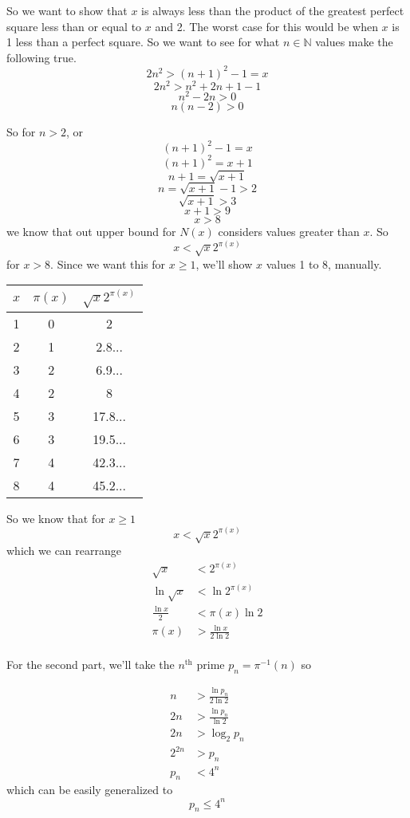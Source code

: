 \documentclass[12pt]{article}
\begin{document}
So we want to show that $x$ is always less than the product of the greatest perfect square less than or equal to $x$ and 2. The worst case for this would be when $x$ is 1 less than a perfect square. So we want to see for what $n \in \mathbb{N}$ values make the following true.
\[2n^2 > (n+1)^2 - 1 = x\]
\[2n^2 > n^2 + 2n + 1 -1\]
\[n^2 - 2n > 0\]
\[n(n - 2) > 0\]

So for $n > 2$, or
\[(n+1)^2 - 1 = x\]
\[(n+1)^2 = x + 1\]
\[n+1 = \sqrt{x + 1}\]
\[n = \sqrt{x + 1} - 1 > 2\]
\[\sqrt{x + 1} > 3\]
\[x + 1 > 9\]
\[x > 8\]
we know that out upper bound for $N(x)$ considers values greater than $x$. So
\[x < \sqrt{x}2^{\pi(x)}\]
for $x>8$. Since we want this for $x \geq 1$, we'll show $x$ values 1 to 8, manually.

\begin{center}
    \begin{tabular}{|c|c|c|}
        \hline
        $x$ & $\pi(x)$ & $\sqrt{x}2^{\pi(x)}$ \\
        \hline
        1 & 0 & 2\\
        2 & 1 & 2.8...\\
        3 & 2 & 6.9...\\
        4 & 2 & 8\\
        5 & 3 & 17.8...\\
        6 & 3 & 19.5...\\
        7 & 4 & 42.3...\\
        8 & 4 & 45.2...\\
        \hline
    \end{tabular}
\end{center}

So we know that for $x \geq 1$
\[x < \sqrt{x}2^{\pi(x)}\]
which we can rearrange
\begin{align*}
    \sqrt{x} &< 2^{\pi(x)} \\
    \ln \sqrt{x} &< \ln 2^{\pi(x)} \\
    \frac{\ln x}{2} &< \pi(x)\ln 2 \\
    \pi(x) &> \frac{\ln x}{2\ln 2} \\
\end{align*}

For the second part, we'll take the $n^\text{th}$ prime $p_n = \pi^{-1}(n)$ so 

\begin{align*}
    n &> \frac{\ln p_n}{2\ln 2} \\
    2n &> \frac{\ln p_n}{\ln 2} \\
    2n &> \log_2 p_n \\
    2^{2n} &> p_n \\
    p_n &< 4^n
\end{align*}
which can be easily generalized to
\[p_n \leq 4^n\]
\end{document}
